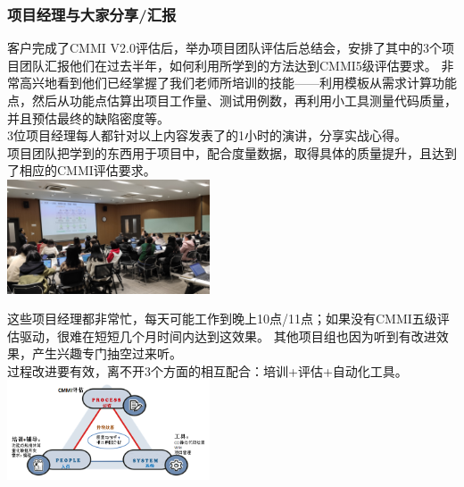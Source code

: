 \hypertarget{ux9879ux76eeux7ecfux7406ux4e0eux5927ux5bb6ux5206ux4eabux6c47ux62a5}{%
\subsubsection{项目经理与大家分享/汇报}\label{ux9879ux76eeux7ecfux7406ux4e0eux5927ux5bb6ux5206ux4eabux6c47ux62a5}}

客户完成了CMMI
V2.0评估后，举办项目团队评估后总结会，安排了其中的3个项目团队汇报他们在过去半年，如何利用所学到的方法达到CMMI5级评估要求。
非常高兴地看到他们已经掌握了我们老师所培训的技能------利用模板从需求计算功能点，然后从功能点估算出项目工作量、测试用例数，再利用小工具测量代码质量，并且预估最终的缺陷密度等。\\
3位项目经理每人都针对以上内容发表了的1小时的演讲，分享实战心得。\\
项目团队把学到的东西用于项目中，配合度量数据，取得具体的质量提升，且达到了相应的CMMI评估要求。\\

\includegraphics[width=6cm]{000.jpg}

这些项目经理都非常忙，每天可能工作到晚上10点/11点；如果没有CMMI五级评估驱动，很难在短短几个月时间内达到这效果。
其他项目组也因为听到有改进效果，产生兴趣专门抽空过来听。\\
过程改进要有效，离不开3个方面的相互配合：培训+评估+自动化工具。\\

\includegraphics[width=6cm]{3个关键点图1.png}


